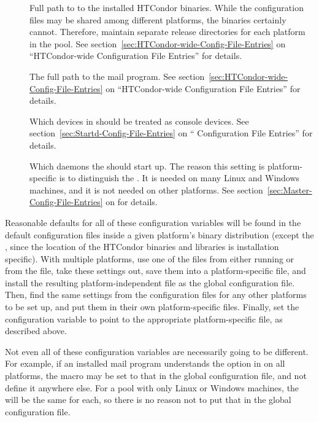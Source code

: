 \begin{description}

\item[] Full path to to the installed
  HTCondor binaries.  While the configuration files may be shared among
  different platforms, the binaries certainly cannot.  Therefore,
  maintain separate release directories for each platform
  in the pool.  See section~\ref{sec:HTCondor-wide-Config-File-Entries}
  on ``HTCondor-wide Configuration File Entries'' for details.

\item[] The full path to the mail program.  See
  section~\ref{sec:HTCondor-wide-Config-File-Entries} on ``HTCondor-wide
  Configuration File Entries'' for details.

\item[] Which devices in  should be
  treated as console devices.  See
  section~\ref{sec:Startd-Config-File-Entries} on ``
  Configuration File Entries'' for details.

\item[] Which daemons the  should
  start up.  The reason this setting is platform-specific is
  to distinguish the .
  It is needed on many Linux and Windows machines,
  and it is not needed on other platforms.
  See section~\ref{sec:Master-Config-File-Entries} on
  for details.

\end{description}

Reasonable defaults for all of these configuration variables
will be found in the
default configuration files inside a given platform's binary distribution
(except the , since 
the location of the HTCondor binaries and libraries is installation specific).
With multiple platforms,
use one of the  files from
either running  or from the
 file,
take these settings out,
save them into a platform-specific file,
and install the resulting platform-independent file as the global
configuration file.
Then,
find the same settings from the configuration files for any other platforms
to be set up, and put them in their own platform-specific files.
Finally, set the  configuration variable
to point to
the appropriate platform-specific file, as described above.

Not even all of these configuration variables are necessarily
going to be different.
For example, if an installed mail program understands the
 option in  on all platforms,
the  macro may be set to that in the global configuration
file, and not define it anywhere else.
For a pool with only Linux or Windows machines,
the  will be the same for each, so there is no
reason not to put that in the global configuration file.

